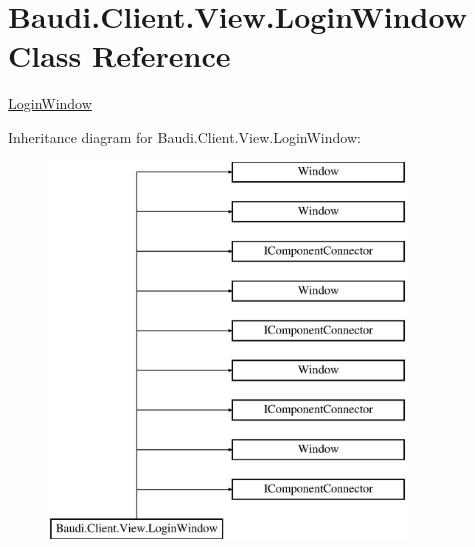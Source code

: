 \hypertarget{class_baudi_1_1_client_1_1_view_1_1_login_window}{}\section{Baudi.\+Client.\+View.\+Login\+Window Class Reference}
\label{class_baudi_1_1_client_1_1_view_1_1_login_window}


\hyperlink{class_baudi_1_1_client_1_1_view_1_1_login_window}{Login\+Window}  


Inheritance diagram for Baudi.\+Client.\+View.\+Login\+Window\+:\begin{figure}[H]
\begin{center}
\leavevmode
\includegraphics[height=10.000000cm]{class_baudi_1_1_client_1_1_view_1_1_login_window}
\end{center}
\end{figure}
